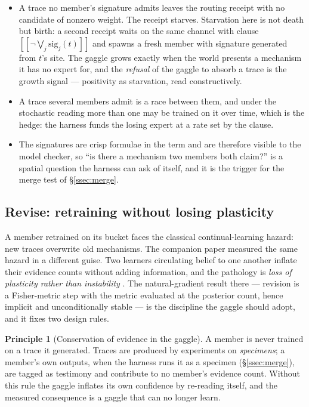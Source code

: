 \documentclass[11pt]{article}
\theoremstyle{plain}
\theoremstyle{definition}
\newtheorem{principle}[theorem]{Principle}
\theoremstyle{remark}
\newcommand{\crisp}[1]{[\![#1]\!]}
\begin{document}
\begin{itemize}[leftmargin=1.4em,itemsep=2pt]
\item A trace no member's signature admits leaves the routing receipt with no
candidate of nonzero weight. The receipt starves. Starvation here is not death
but birth: a second receipt waits on the same channel with clause
$\crisp{\neg \bigvee_j \mathrm{sig}_j(t)}$ and spawns a fresh member with
signature generated from $t$'s site. The gaggle grows exactly when the world
presents a mechanism it has no expert for, and the \emph{refusal} of the gaggle
to absorb a trace is the growth signal --- positivity as starvation, read
constructively.
\item A trace several members admit is a race between them, and under the
stochastic reading more than one may be trained on it over time, which is the
hedge: the harness funds the losing expert at a rate set by the clause.
\item The signatures are crisp formulae in the term and are therefore visible
to the model checker, so ``is there a mechanism two members both claim?'' is a
spatial question the harness can ask of itself, and it is the trigger for the
merge test of \S\ref{ssec:merge}.
\end{itemize}

\subsection{Revise: retraining without losing plasticity}\label{ssec:revise}

A member retrained on its bucket faces the classical continual-learning
hazard: new traces overwrite old mechanisms. The companion paper measured the
same hazard in a different guise. Two learners circulating belief to one another
inflate their evidence counts without adding information, and the pathology is
\emph{loss of plasticity rather than instability} \cite[\S11]{GradedPLN}. The
natural-gradient result there --- revision is a Fisher-metric step with the
metric evaluated at the posterior count, hence implicit and unconditionally
stable --- is the discipline the gaggle should adopt, and it fixes two design
rules.

\begin{principle}[Conservation of evidence in the gaggle]\label{prin:evidence}
A member is never trained on a trace it generated. Traces are produced by
experiments on \emph{specimens}; a member's own outputs, when the harness runs it
as a specimen (\S\ref{ssec:merge}), are tagged as testimony and contribute to no
member's evidence count. Without this rule the gaggle inflates its own
confidence by re-reading itself, and the measured consequence is a gaggle that
can no longer learn.
\end{principle}
\end{document}
